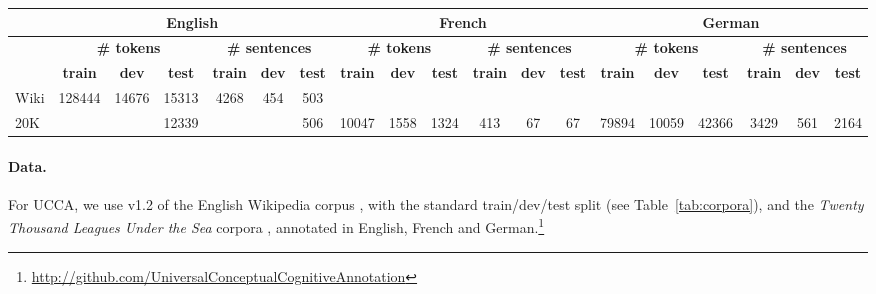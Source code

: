 \documentclass[11pt,a4paper]{article}
\begin{document}
\begin{table*}[t]
\centering
\small
\setlength\tabcolsep{2pt}
\begin{tabular}{l|ccc|ccc||ccc|ccc||ccc|ccc}
& \multicolumn{6}{c||}{\footnotesize \bf English}
& \multicolumn{6}{c||}{\footnotesize \bf French}
& \multicolumn{6}{c}{\footnotesize \bf German} \\
\hline
& \multicolumn{3}{c|}{\footnotesize \bf {\#} tokens}
& \multicolumn{3}{c||}{\footnotesize \bf {\#} sentences}
& \multicolumn{3}{c|}{\footnotesize \bf {\#} tokens}
& \multicolumn{3}{c||}{\footnotesize \bf {\#} sentences}
& \multicolumn{3}{c|}{\footnotesize \bf {\#} tokens}
& \multicolumn{3}{c}{\footnotesize \bf {\#} sentences} \\
& \footnotesize \bf train & \footnotesize \bf dev & \footnotesize \bf test
& \footnotesize \bf train & \footnotesize \bf dev & \footnotesize \bf test
& \footnotesize \bf train & \footnotesize \bf dev & \footnotesize \bf test 
& \footnotesize \bf train & \footnotesize \bf dev & \footnotesize \bf test
& \footnotesize \bf train & \footnotesize \bf dev & \footnotesize \bf test
& \footnotesize \bf train & \footnotesize \bf dev & \footnotesize \bf test \\
\hline
Wiki & 128444 & 14676 & 15313 & 4268 & 454 & 503 &&&&&&&&&&&& \\
20K &&& 12339 &&& 506 & 10047 & 1558 & 1324 & 413 & 67 & 67 & 79894 & 10059 & 42366 & 3429 & 561 & 2164
\end{tabular}
\caption{Number of tokens and sentences in the training, development and test sets
we use for each corpus and language.\label{tab:corpora}}
\end{table*}

\paragraph{Data.}

For UCCA, we use v1.2 of the English Wikipedia corpus \cite{abend2013universal},
with the standard train/dev/test split (see Table~\ref{tab:corpora}),
and the \textit{Twenty Thousand Leagues Under the Sea} corpora
\cite{sulem2015conceptual},
annotated in English, French and German.\footnote{\url{http://github.com/UniversalConceptualCognitiveAnnotation}}
\end{document}
